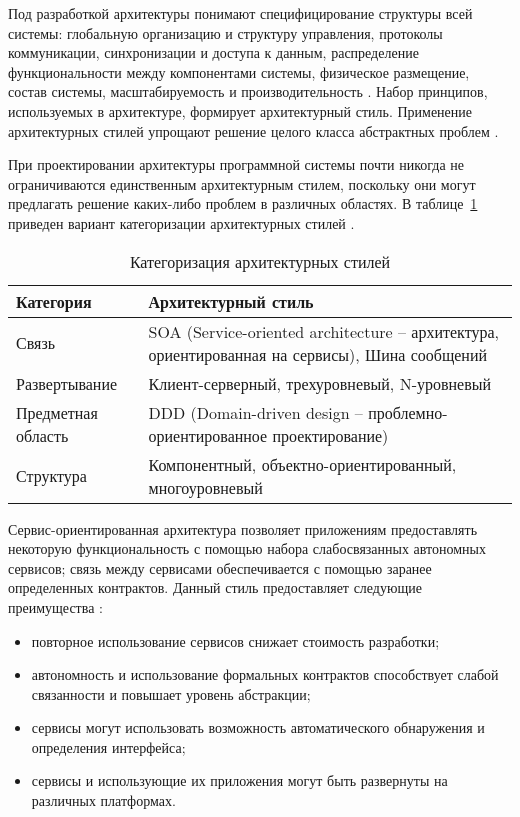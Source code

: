 Под разработкой архитектуры понимают специфицирование структуры всей системы: глобальную организацию и структуру
управления, протоколы коммуникации, синхронизации и доступа к данным, распределение функциональности между компонентами
системы, физическое размещение, состав системы, масштабируемость и производительность \cite{introduction_to_architecture}.
Набор принципов, используемых в архитектуре, формирует архитектурный стиль. Применение архитектурных стилей
упрощают решение целого класса абстрактных проблем \cite{architecture_volosevich}.

При проектировании архитектуры программной системы почти никогда не ограничиваются единственным архитектурным стилем,
поскольку они могут предлагать решение каких-либо проблем в различных областях.
В таблице~\ref{table:analysis:architectures:categorization} приведен вариант категоризации архитектурных
стилей \cite{application_architecture_guide}.

\begin{table}[ht]
  \caption{Категоризация архитектурных стилей}
  \label{table:analysis:architectures:categorization}
  \centering
  \begin{tabular}{|>{\raggedright}m{} 
                  |>{\raggedright\arraybackslash}m{}|}
    \hline Категория & Архитектурный стиль\\
    \hline Связь & SOA (Service-oriented architecture -- архитектура, ориентированная на сервисы), Шина сообщений\\
    \hline Развертывание & Клиент-серверный, трехуровневый, N-уровневый\\
    \hline Предметная область & DDD (Domain-driven design -- проблемно-ориентированное проектирование)\\
    \hline Структура & Компонентный, объектно-ориентированный, многоуровневый\\
    \hline
  \end{tabular}
\end{table}

Сервис-ориентированная архитектура позволяет приложениям предоставлять некоторую функциональность с помощью
набора слабосвязанных автономных сервисов; связь между сервисами обеспечивается с помощью заранее определенных
контрактов. Данный стиль предоставляет следующие преимущества \cite{application_architecture_guide}:

\begin{itemize}
	\item повторное использование сервисов снижает стоимость разработки;
	\item автономность и использование формальных контрактов способствует слабой связанности и повышает уровень абстракции;
	\item сервисы могут использовать возможность автоматического обнаружения и определения интерфейса;
	\item сервисы и использующие их приложения могут быть развернуты на различных платформах.
\end{itemize}

